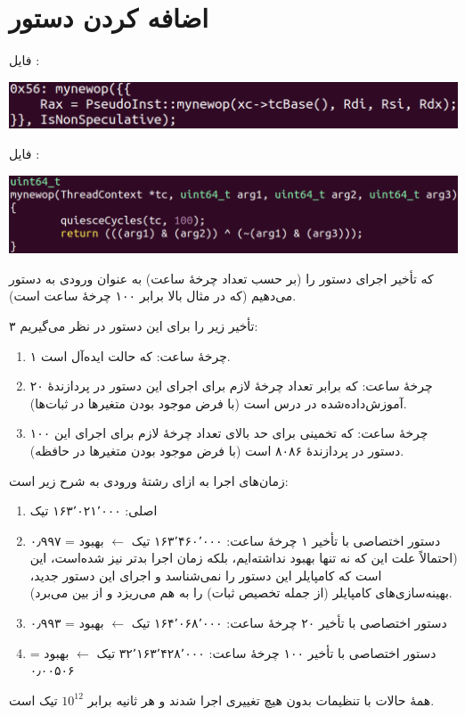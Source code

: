 \documentclass[12pt,titlepage,a4page , tikz , multi,table , svgnames,xcdraw]{article}
\begin{document}
\section{اضافه کردن دستور}
فایل
:
\par
\includegraphics[width=\textwidth]{3.png}
\par
فایل
:
\par
\includegraphics[width=\textwidth]{4.png}
\par
که تأخیر اجرای دستور را (بر حسب تعداد چرخهٔ ساعت) به عنوان ورودی به دستور
می‌دهیم (که در مثال بالا برابر ۱۰۰ چرخهٔ ساعت است).
\par
۳ تأخیر زیر را برای این دستور در نظر می‌گیریم:
\begin{enumerate}
\item
۱ چرخهٔ ساعت: که حالت ایده‌آل است.
\item
۲۰ چرخهٔ ساعت: که برابر تعداد چرخهٔ لازم برای اجرای این دستور در پردازندهٔ
آموزش‌داده‌شده در درس است (با فرض موجود بودن متغیرها در ثبات‌ها).
\item
۱۰۰ چرخهٔ ساعت: که تخمینی برای حد بالای تعداد چرخهٔ لازم برای اجرای این دستور در پردازندهٔ ۸۰۸۶ است (با فرض موجود بودن متغیرها در حافظه).
\end{enumerate}
زمان‌های اجرا به ازای رشتهٔ ورودی
 به شرح زیر است:
\begin{enumerate}
\item
{}
اصلی: ۱۶۳٬۰۲۱٬۰۰۰ تیک
\item
دستور اختصاصی با تأخیر ۱ چرخهٔ ساعت: ۱۶۳٬۴۶۰٬۰۰۰ تیک
$\leftarrow$
بهبود = ۰٫۹۹۷ (احتمالاً علت این که نه تنها بهبود نداشته‌ایم، بلکه زمان اجرا بدتر نیز شده‌است، این است که کامپایلر این دستور را نمی‌شناسد و اجرای این دستور جدید، بهینه‌سازی‌های کامپایلر (از جمله تخصیص ثبات) را به هم می‌ریزد و از بین می‌برد).
\item
دستور اختصاصی با تأخیر ۲۰ چرخهٔ ساعت: ۱۶۴٬۰۶۸٬۰۰۰ تیک
$\leftarrow$
بهبود = ۰٫۹۹۳
\item
دستور اختصاصی با تأخیر ۱۰۰ چرخهٔ ساعت: ۳۲٬۱۶۳٬۴۲۸٬۰۰۰ تیک
$\leftarrow$
بهبود = ۰٫۰۰۵۰۶
\end{enumerate}
همهٔ حالات با تنظیمات
بدون هیچ تغییری اجرا شدند و هر ثانیه برابر
$10^{12}$
تیک است.
\newpage
\end{document}
